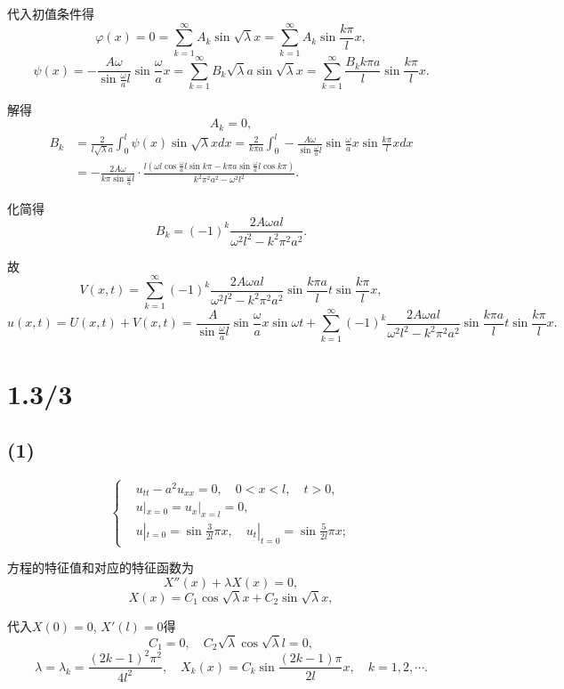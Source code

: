 \documentclass[11pt,a4paper]{article}
\begin{document}
代入初值条件得
$$\varphi(x)=0=\sum_{k=1}^\infty A_k\sin\sqrt{\lambda}x=\sum_{k=1}^\infty A_k\sin\frac{k\pi }{l}x,$$
$$\psi(x)=-\frac{A\omega}{\sin\frac{\omega}{a}l}\sin\frac{\omega}{a}x=\sum_{k=1}^\infty B_k\sqrt{\lambda}a\sin\sqrt{\lambda}x=\sum_{k=1}^\infty \frac{B_kk\pi a}{l}\sin\frac{k\pi}{l}x.$$

解得
$$A_k=0,$$
\begin{align*}
  B_k & =\frac{2}{l\sqrt{\lambda}a}\int_0^l\psi(x)\sin\sqrt{\lambda}xdx=
  \frac{2}{k\pi a}\int_0^l -\frac{A\omega}{\sin\frac{\omega}{a}l}\sin\frac{\omega}{a}x\sin\frac{k\pi}{l}xdx                                                                         \\
      & =-\frac{2A\omega}{k\pi\sin\frac{\omega}{a}l}\cdot\frac{l\left(\omega l\cos\frac{\omega}{a}l\sin k\pi-k\pi a\sin\frac{\omega}{a}l\cos k\pi\right)}{k^2\pi^2a^2-\omega^2l^2}.
\end{align*}

化简得
$$B_k=(-1)^k\frac{2A\omega al}{\omega^2l^2-k^2\pi^2a^2}.$$

故
$$V(x,t)=\sum_{k=1}^\infty(-1)^k\frac{2A\omega al}{\omega^2l^2-k^2\pi^2a^2}\sin\frac{k\pi a}{l}t\sin\frac{k\pi}{l}x,$$
$$u(x,t)=U(x,t)+V(x,t)=\frac{A}{\sin\frac{\omega}{a}l}\sin\frac{\omega}{a}x\sin\omega t+\sum_{k=1}^\infty(-1)^k\frac{2A\omega al}{\omega^2l^2-k^2\pi^2a^2}\sin\frac{k\pi a}{l}t\sin\frac{k\pi}{l}x.$$

\section{1.3/3}

\subsection*{(1)}

$$
  \left\{\begin{aligned}
     & u_{tt}-a^2u_{xx}=0, \quad 0<x<l,\quad t>0,                             \\
     & u|_{x=0}=u_x|_{x=l}=0,                                                 \\
     & u|_{t=0}=\sin\frac{3}{2l}\pi x,\quad u_t|_{t=0}=\sin\frac{5}{2l}\pi x;
  \end{aligned}\right.
$$

方程的特征值和对应的特征函数为
$$X''(x)+\lambda X(x)=0,$$
$$X(x)=C_1\cos\sqrt{\lambda}x+C_2\sin\sqrt{\lambda}x,$$

代入$X(0)=0$, $X'(l)=0$得
$$C_1=0,\quad C_2\sqrt{\lambda}\cos\sqrt{\lambda}l=0,$$
$$\lambda=\lambda_k=\frac{(2k-1)^2\pi^2}{4l^2},\quad X_k(x)=C_k\sin\frac{(2k-1)\pi}{2l}x,\quad k=1,2,\cdots.$$
\end{document}
